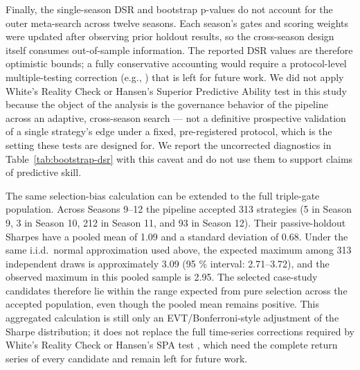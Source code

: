 \documentclass[analytics,article,submit,pdftex,moreauthors]{Definitions/mdpi}
\begin{document}
Finally, the single-season DSR and bootstrap p-values do not account for the outer meta-search across twelve seasons. Each season's gates and scoring weights were updated after observing prior holdout results, so the cross-season design itself consumes out-of-sample information. The reported DSR values are therefore optimistic bounds; a fully conservative accounting would require a protocol-level multiple-testing correction (e.g., \citep{romano_2005}) that is left for future work. We did not apply White's Reality Check \citep{white_2000} or Hansen's Superior Predictive Ability test \citep{hansen_2005} in this study because the object of the analysis is the governance behavior of the pipeline across an adaptive, cross-season search --- not a definitive prospective validation of a single strategy's edge under a fixed, pre-registered protocol, which is the setting these tests are designed for. We report the uncorrected diagnostics in Table~\ref{tab:bootstrap-dsr} with this caveat and do not use them to support claims of predictive skill.

The same selection-bias calculation can be extended to the full triple-gate population. Across Seasons 9--12 the pipeline accepted 313 strategies (5 in Season 9, 3 in Season 10, 212 in Season 11, and 93 in Season 12). Their passive-holdout Sharpes have a pooled mean of 1.09 and a standard deviation of 0.68. Under the same i.i.d.~normal approximation used above, the expected maximum among 313 independent draws is approximately 3.09 (95 \% interval: 2.71--3.72), and the observed maximum in this pooled sample is 2.95. The selected case-study candidates therefore lie within the range expected from pure selection across the accepted population, even though the pooled mean remains positive. This aggregated calculation is still only an EVT/Bonferroni-style adjustment of the Sharpe distribution; it does not replace the full time-series corrections required by White's Reality Check \citep{white_2000} or Hansen's SPA test \citep{hansen_2005}, which need the complete return series of every candidate and remain left for future work.
\end{document}
